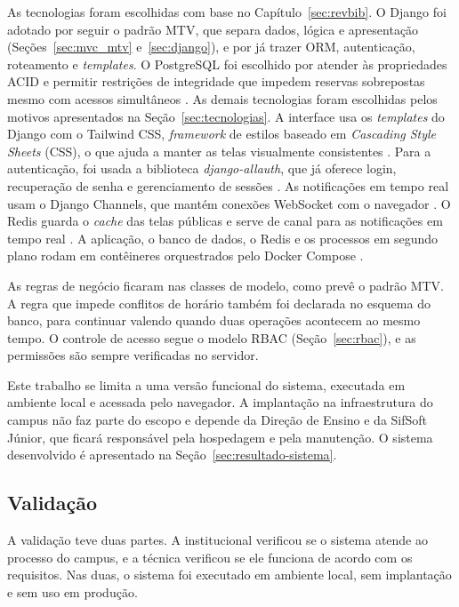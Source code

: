 As tecnologias foram escolhidas com base no Capítulo~\ref{sec:revbib}. O Django foi adotado por seguir o padrão MTV, que separa dados, lógica e apresentação (Seções~\ref{sec:mvc_mtv} e~\ref{sec:django}), e por já trazer ORM, autenticação, roteamento e \textit{templates}. O PostgreSQL foi escolhido por atender às propriedades ACID e permitir restrições de integridade que impedem reservas sobrepostas mesmo com acessos simultâneos \cite{silberschatz2012,postgresql2024}. As demais tecnologias foram escolhidas pelos motivos apresentados na Seção~\ref{sec:tecnologias}. A interface usa os \textit{templates} do Django com o Tailwind CSS, \textit{framework} de estilos baseado em \textit{Cascading Style Sheets} (CSS), o que ajuda a manter as telas visualmente consistentes \cite{tailwinddocs}. Para a autenticação, foi usada a biblioteca \textit{django-allauth}, que já oferece login, recuperação de senha e gerenciamento de sessões \cite{pennersr2024}. As notificações em tempo real usam o Django Channels, que mantém conexões WebSocket com o navegador \cite{channelsdocs,rfc6455}. O Redis guarda o \textit{cache} das telas públicas e serve de canal para as notificações em tempo real \cite{redisdocs}. A aplicação, o banco de dados, o Redis e os processos em segundo plano rodam em contêineres orquestrados pelo Docker Compose \cite{dockerdocs}.

As regras de negócio ficaram nas classes de modelo, como prevê o padrão MTV. A regra que impede conflitos de horário também foi declarada no esquema do banco, para continuar valendo quando duas operações acontecem ao mesmo tempo. O controle de acesso segue o modelo RBAC (Seção~\ref{sec:rbac}), e as permissões são sempre verificadas no servidor.

Este trabalho se limita a uma versão funcional do sistema, executada em ambiente local e acessada pelo navegador. A implantação na infraestrutura do campus não faz parte do escopo e depende da Direção de Ensino e da SifSoft Júnior, que ficará responsável pela hospedagem e pela manutenção. O sistema desenvolvido é apresentado na Seção~\ref{sec:resultado-sistema}.

\subsection{Validação}
\label{sec:validacao}

A validação teve duas partes. A institucional verificou se o sistema atende ao processo do campus, e a técnica verificou se ele funciona de acordo com os requisitos. Nas duas, o sistema foi executado em ambiente local, sem implantação e sem uso em produção.

